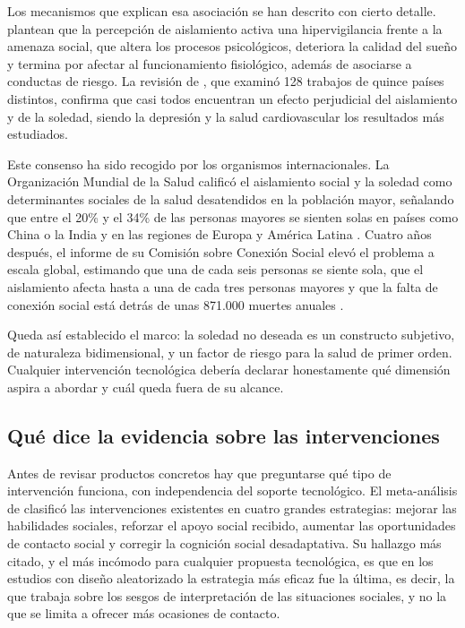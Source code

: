 Los mecanismos que explican esa asociación se han descrito con cierto detalle. \textcite{Hawkley2010} plantean que la
percepción de aislamiento activa una hiper\-vigilancia frente a la amenaza social, que altera los procesos
psicológicos, deteriora la calidad del sueño y termina por afectar al funcionamiento fisiológico, además de
asociarse a conductas de riesgo. La revisión de \textcite{Courtin2017}, que examinó 128 trabajos de quince países
distintos, confirma que casi todos encuentran un efecto perjudicial del aislamiento y de la soledad, siendo la
depresión y la salud cardiovascular los resultados más estudiados.

Este consenso ha sido recogido por los organismos internacionales. La Organización Mundial de la Salud
calificó el aislamiento social y la soledad como determinantes sociales de la salud desatendidos en la
población mayor, señalando que entre el 20\% y el 34\% de las personas mayores se sienten solas en países como
China o la India y en las regiones de Europa y América Latina \citep{OMS2021}. Cuatro años después, el informe
de su Comisión sobre Conexión Social elevó el problema a escala global, estimando que una de cada seis
personas se siente sola, que el aislamiento afecta hasta a una de cada tres personas mayores y que la falta de
conexión social está detrás de unas 871.000 muertes anuales \citep{OMS2025}.

Queda así establecido el marco: la soledad no deseada es un constructo subjetivo, de naturaleza bidimensional,
y un factor de riesgo para la salud de primer orden. Cualquier intervención tecnológica debería declarar
honestamente qué dimensión aspira a abordar y cuál queda fuera de su alcance.

\subsection{Qué dice la evidencia sobre las intervenciones}

Antes de revisar productos concretos hay que preguntarse qué tipo de intervención funciona, con independencia
del soporte tecnológico. El meta-análisis de \textcite{Masi2011} clasificó las intervenciones existentes en
cuatro grandes estrategias: mejorar las habilidades sociales, reforzar el apoyo social recibido, aumentar las
oportunidades de contacto social y corregir la cognición social desadaptativa. Su hallazgo más citado, y el
más incómodo para cualquier propuesta tecnológica, es que en los estudios con diseño aleatorizado la
estrategia más eficaz fue la última, es decir, la que trabaja sobre los sesgos de interpretación de las
situaciones sociales, y no la que se limita a ofrecer más ocasiones de contacto.

